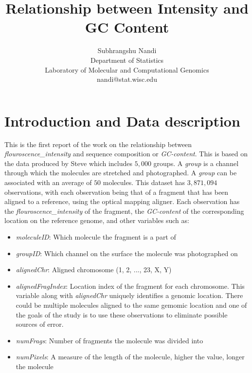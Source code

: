 \documentclass[11pt]{article}
\begin{document}


\title{Relationship between Intensity and GC Content}
\author{Subhrangshu Nandi\\
  Department of Statistics\\
  Laboratory of Molecular and Computational Genomics\\
  nandi@stat.wisc.edu}
\maketitle
\noindent
\section{Introduction and Data description}
This is the first report of the work on the relationship between {\emph{flouroscence\_intensity}} and sequence composition or {\emph{GC-content}}. This is based on the data produced by Steve which includes $5,000$ groups. A {\emph{group}} is a channel through which the molecules are stretched and photographed. A {\emph{group}} can be associated with an average of $50$ molecules. This dataset has $3,871,094$ observations, with each observation being that of a fragment that has been aligned to a reference, using the optical mapping aligner. Each observation has the {\emph{flouroscence\_intensity}} of the fragment, the {\emph{GC-content}} of the corresponding location on the reference genome, and other variables such as:
\begin{itemize}
\item
{\emph{moleculeID}}: Which molecule the fragment is a part of
\item
{\emph{groupID}}: Which channel on the surface the molecule was photographed on
\item
{\emph{alignedChr}}: Aligned chromosome (1, 2, ..., 23, X, Y)
\item
{\emph{alignedFragIndex}}: Location index of the fragment for each chromosome. This variable along with {\emph{alignedChr}} uniquely identifies a genomic location. There could be multiple molecules aligned to the same gemomic location and one of the goals of the study is to use these observations to eliminate possible sources of error.
\item
{\emph{numFrags}}: Number of fragments the molecule was divided into
\item
{\emph{numPixels}}: A measure of the length of the molecule, higher the value, longer the molecule
\end{itemize}
\end{document}
